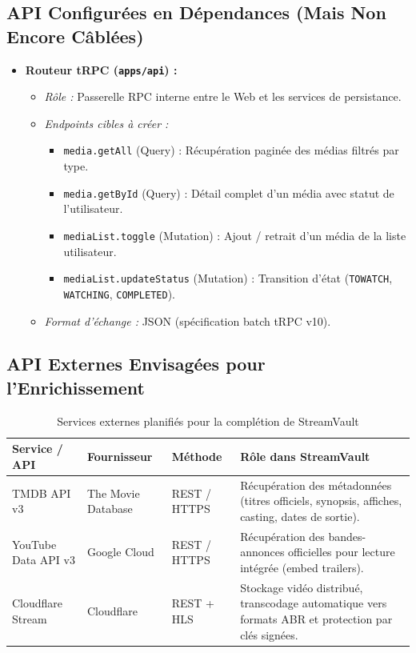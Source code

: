 \documentclass[11pt,a4paper]{article}
\begin{document}
\subsection{API Configurées en Dépendances (Mais Non Encore Câblées)}
\begin{itemize}
    \item \textbf{Routeur tRPC (\texttt{apps/api}) :}
    \begin{itemize}
        \item \emph{Rôle :} Passerelle RPC interne entre le Web et les services de persistance.
        \item \emph{Endpoints cibles à créer :}
        \begin{itemize}
            \item \texttt{media.getAll} (Query) : Récupération paginée des médias filtrés par type.
            \item \texttt{media.getById} (Query) : Détail complet d'un média avec statut de l'utilisateur.
            \item \texttt{mediaList.toggle} (Mutation) : Ajout / retrait d'un média de la liste utilisateur.
            \item \texttt{mediaList.updateStatus} (Mutation) : Transition d'état (\texttt{TOWATCH}, \texttt{WATCHING}, \texttt{COMPLETED}).
        \end{itemize}
        \item \emph{Format d'échange :} JSON (spécification batch tRPC v10).
    \end{itemize}
\end{itemize}

\subsection{API Externes Envisagées pour l'Enrichissement}
\begin{table}[htbp]
\centering
\small
\renewcommand{\arraystretch}{1.2}
\begin{tabularx}{\textwidth}{p{3.5cm} p{2.2cm} p{2cm} X}
\toprule
\textbf{Service / API} & \textbf{Fournisseur} & \textbf{Méthode} & \textbf{Rôle dans StreamVault} \\
\midrule
TMDB API v3 & The Movie Database & REST / HTTPS & Récupération des métadonnées (titres officiels, synopsis, affiches, casting, dates de sortie). \\
\midrule
YouTube Data API v3 & Google Cloud & REST / HTTPS & Récupération des bandes-annonces officielles pour lecture intégrée (embed trailers). \\
\midrule
Cloudflare Stream & Cloudflare & REST + HLS & Stockage vidéo distribué, transcodage automatique vers formats ABR et protection par clés signées. \\
\bottomrule
\end{tabularx}
\caption{Services externes planifiés pour la complétion de StreamVault}
\end{table}
\end{document}
